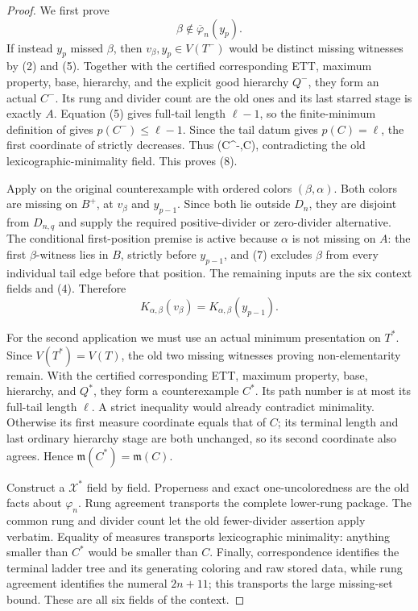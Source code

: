 \begin{proof}
We first prove
\[
                    \beta\notin\overline\varphi_n(y_p).     \tag{8}
\]
If instead \(y_p\) missed \(\beta\), then \(v_\beta,y_p\in V(T^-)\)
would be distinct missing witnesses by (2) and (5).  Together with the
certified corresponding ETT, maximum property, base, hierarchy, and the
explicit good hierarchy \(Q^-\), they form an actual
 \(C^-\).  Its rung and divider count
are the old ones and its last starred stage is exactly \(A\).  Equation
(5) gives full-tail length \(\ell-1\), so the finite-minimum definition
of  gives \(p(C^-)\le\ell-1\).  Since the
tail datum gives \(p(C)=\ell\), the first coordinate of
 strictly decreases.
Thus (C^-,C)\), contradicting the
old lexicographic-minimality field.  This proves (8).

Apply  on the original counterexample with ordered
colors \((\beta,\alpha)\).  Both colors are missing on \(B^+\), at
\(v_\beta\) and \(y_{p-1}\).  Since both lie outside \(D_n\), they are
disjoint from \(D_{n,q}\) and supply the required positive-divider or
zero-divider alternative.  The conditional first-position premise is
active because \(\alpha\) is not missing on \(A\): the first
\(\beta\)-witness lies in \(B\), strictly before \(y_{p-1}\), and (7)
excludes \(\beta\) from every individual tail edge before that position.
The remaining inputs are the six context fields and (4).  Therefore
\[
 K_{\alpha,\beta}(v_\beta)
       =K_{\alpha,\beta}(y_{p-1}).                           \tag{9}
\]

For the second application we must use an actual minimum presentation on
\(T^*\).  Since \(V(T^*)=V(T)\), the old two missing witnesses proving
non-elementarity remain.  With the certified corresponding ETT, maximum
property, base, hierarchy, and \(Q^*\), they form a counterexample
\(C^*\).  Its path number is at most its full-tail length \(\ell\).  A
strict inequality would already contradict minimality.  Otherwise its
first measure coordinate equals that of \(C\); its terminal length and
last ordinary hierarchy stage are both unchanged, so its second
coordinate also agrees.  Hence
\(\mathfrak m(C^*)=\mathfrak m(C)\).

Construct a  \(\mathcal
X^*\) field by field.  Properness and exact one-uncoloredness are the old
facts about \(\varphi_n\).  Rung agreement transports the complete
lower-rung package.  The common rung and divider count let the old
fewer-divider assertion apply verbatim.  Equality of measures transports
lexicographic minimality: anything smaller than \(C^*\) would be smaller
than \(C\).  Finally, correspondence identifies the terminal ladder tree
and its generating coloring and raw stored data, while rung agreement
identifies the numeral \(2n+11\); this transports the large missing-set
bound.  These are all six fields of the context.


\end{proof}
